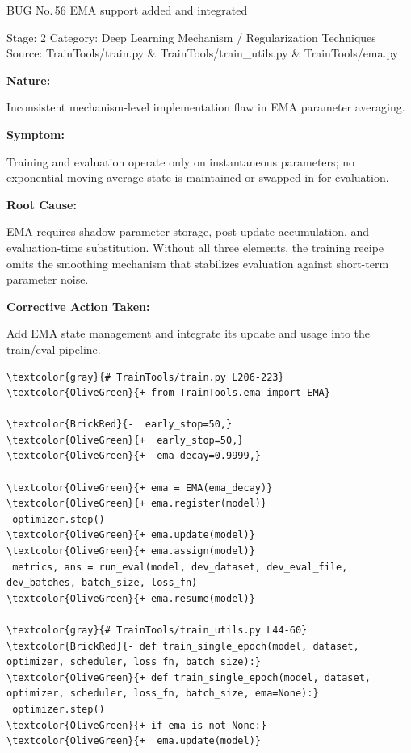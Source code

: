 \documentclass[10pt]{article}
\newcommand{\FieldLabel}[1]{%
 {\bfseries #1:}\par
}
\begin{document}
\begin{bugbox}{BUG No.\,56 \quad EMA support added and integrated}
{\color{MetaGray}\small Stage: 2 \;\textbar\; Category: Deep Learning Mechanism / Regularization Techniques \;\textbar\; Source: TrainTools/train.py \& TrainTools/train\_utils.py \& TrainTools/ema.py\par}
\vspace{0.22em}
\FieldLabel{Nature}
Inconsistent mechanism-level implementation flaw in EMA parameter averaging.
\par
\vspace{0.35em}
\FieldLabel{Symptom}
Training and evaluation operate only on instantaneous parameters; no exponential moving-average state is maintained or swapped in for evaluation.
\par
\vspace{0.35em}
\FieldLabel{Root Cause}
EMA requires shadow-parameter storage, post-update accumulation, and evaluation-time substitution. Without all three elements, the training recipe omits the smoothing mechanism that stabilizes evaluation against short-term parameter noise.
\par
\vspace{0.35em}
\FieldLabel{Corrective Action Taken}
Add EMA state management and integrate its update and usage into the train/eval pipeline.
\par
\vspace{0.35em}
\begin{Verbatim}[commandchars=\\\{\},fontsize=\footnotesize,breaklines=true,breaksymbol={},frame=leftline,framerule=2pt,rulecolor=\color{gray!40},xleftmargin=6pt,formatcom=\singlespacing]
\textcolor{gray}{# TrainTools/train.py L206-223}
\textcolor{OliveGreen}{+ from TrainTools.ema import EMA}
 
\textcolor{BrickRed}{-  early_stop=50,}
\textcolor{OliveGreen}{+  early_stop=50,}
\textcolor{OliveGreen}{+  ema_decay=0.9999,}
 
\textcolor{OliveGreen}{+ ema = EMA(ema_decay)}
\textcolor{OliveGreen}{+ ema.register(model)}
 optimizer.step()
\textcolor{OliveGreen}{+ ema.update(model)}
\textcolor{OliveGreen}{+ ema.assign(model)}
 metrics, ans = run_eval(model, dev_dataset, dev_eval_file, dev_batches, batch_size, loss_fn)
\textcolor{OliveGreen}{+ ema.resume(model)}
 
\textcolor{gray}{# TrainTools/train_utils.py L44-60}
\textcolor{BrickRed}{- def train_single_epoch(model, dataset, optimizer, scheduler, loss_fn, batch_size):}
\textcolor{OliveGreen}{+ def train_single_epoch(model, dataset, optimizer, scheduler, loss_fn, batch_size, ema=None):}
 optimizer.step()
\textcolor{OliveGreen}{+ if ema is not None:}
\textcolor{OliveGreen}{+  ema.update(model)}
 

\end{Verbatim}
\end{bugbox}
\end{document}

